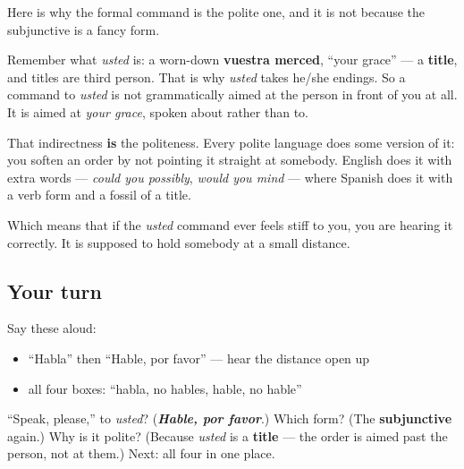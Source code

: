 \begin{culture}
Here is why the formal command is the polite one, and it is not because the subjunctive is a fancy form.

Remember what \emph{usted} is: a worn-down \textbf{vuestra merced}, \textquotedblleft{}your grace\textquotedblright{} — a \textbf{title}, and titles are third person. That is why \emph{usted} takes he/she endings. So a command to \emph{usted} is not grammatically aimed at the person in front of you at all. It is aimed at \emph{your grace}, spoken about rather than to.

That indirectness \textbf{is} the politeness. Every polite language does some version of it: you soften an order by not pointing it straight at somebody. English does it with extra words — \emph{could you possibly}, \emph{would you mind} — where Spanish does it with a verb form and a fossil of a title.

Which means that if the \emph{usted} command ever feels stiff to you, you are hearing it correctly. It is supposed to hold somebody at a small distance.
\end{culture}

\subsection*{Your turn}
Say these aloud:

\begin{itemize}
\raggedright
  \item \textquotedblleft{}Habla\textquotedblright{} then \textquotedblleft{}Hable, por favor\textquotedblright{} — hear the distance open up
  \item all four boxes: \textquotedblleft{}habla, no hables, hable, no hable\textquotedblright{}
\end{itemize}

\begin{tcolorbox}[breakable,colback=teal!4,colframe=teal!35!black,title={Before you move on}]
\textquotedblleft{}Speak, please,\textquotedblright{} to \emph{usted}? (\emph{\textbf{Hable, por favor}}.) Which form? (The \textbf{subjunctive} again.) Why is it polite? (Because \emph{usted} is a \textbf{title} — the order is aimed past the person, not at them.) Next: all four in one place.
\end{tcolorbox}

